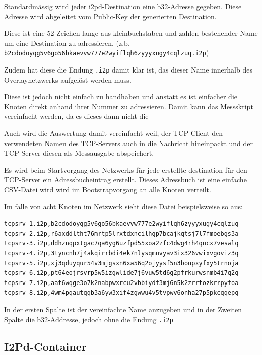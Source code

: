 
Standardmässig wird jeder i2pd-Destination eine b32-Adresse gegeben.
Diese Adresse wird abgeleitet vom Public-Key der generierten Destination.

Diese ist eine 52-Zeichen-lange aus kleinbuchstaben und zahlen bestehender Name um eine Destination zu adressieren. (z.b. \lstinline|b2cdodoyqg5v6go56bkaevvw777e2wyiflqh6zyyyxugy4cqlzuq.i2p|)

Zudem hat diese die Endung \lstinline|.i2p| damit klar ist, das dieser Name innerhalb des Overlaynetzwerks aufgelöst werden muss.

Diese ist jedoch nicht einfach zu handhaben und anstatt es ist einfacher die Knoten direkt anhand ihrer Nummer zu adressieren. Damit kann das Messskript vereinfacht werden, da es dieses dann nicht die 

Auch wird die Auswertung damit vereinfacht weil, der TCP-Client den verwendeten Namen des TCP-Servers auch in die Nachricht hineinpackt und der TCP-Server diesen als Messausgabe abspeichert.

Es wird beim Startvorgang des Netzwerks für jede erstellte destination für den TCP-Server ein Adressbucheintrag erstellt. Dieses Adressbuch ist eine einfache CSV-Datei wird wird 
im Bootstrapvorgang an alle Knoten verteilt.

Im falle von acht Knoten im Netzwerk sieht diese Datei beispielsweise so aus:

\begin{lstlisting}
tcpsrv-1.i2p,b2cdodoyqg5v6go56bkaevvw777e2wyiflqh6zyyyxugy4cqlzuq
tcpsrv-2.i2p,r6axddltht76mrtp5lrxtdxncilhgp7bcajkqtsj7l7fmoebgs3a
tcpsrv-3.i2p,ddhznqpxtgac7qa6yg6uzfpd55xoa2zfc4dwg4rh4qucx7veswlq
tcpsrv-4.i2p,3tyncnh7j4akqirrbdi4ek7nlysqmuvyav3ix326vwixvgoviz3q
tcpsrv-5.i2p,xj3qduyqur54v3mjgsxn6xa56q2ojyysf5n3bonpxyfxy5trnoja
tcpsrv-6.i2p,pt64eojrsvrp5w5izgwlide7j6vuw5td6g2pfrkurwsnmb4i7q2q
tcpsrv-7.i2p,aat6wqge3o7k2nabpwxrcu2vbbiydf3mj6n5k2zrrtozkrrpyfoa
tcpsrv-8.i2p,4wm4pqautqqb3a6yw3xif4zgwwu4v5tvpwv6onha27p5pkcqqepq
\end{lstlisting}

In der ersten Spalte ist der vereinfachte Name anzugeben und in der Zweiten Spalte die b32-Addresse, jedoch ohne die Endung \lstinline|.i2p|

\subsection{I2Pd-Container}

